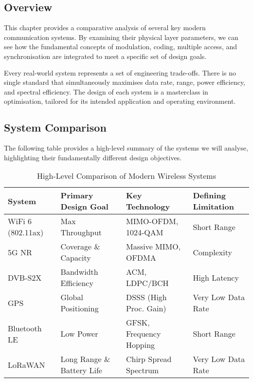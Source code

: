 \subsection{Overview}

This chapter provides a comparative analysis of several key modern communication systems. By examining their physical layer parameters, we can see how the fundamental concepts of modulation, coding, multiple access, and synchronisation are integrated to meet a specific set of design goals.

\begin{keyconcept}
    Every real-world system represents a set of engineering trade-offs. There is no single standard that simultaneously maximises data rate, range, power efficiency, and spectral efficiency. The design of each system is a masterclass in optimisation, tailored for its intended application and operating environment.
\end{keyconcept}


\subsection{System Comparison}

The following table provides a high-level summary of the systems we will analyse, highlighting their fundamentally different design objectives.

\begin{table}[H]
    \centering
    \caption{High-Level Comparison of Modern Wireless Systems}
    \label{tab:system-comparison}
    \begin{tabular}{@{}llll@{}}
        \toprule
        \tableheaderfont System & \tableheaderfont Primary Design Goal & \tableheaderfont Key Technology & \tableheaderfont Defining Limitation \\
        \midrule
        WiFi 6 (802.11ax) & Max Throughput & MIMO-OFDM, 1024-QAM & Short Range \\
        5G NR & Coverage \& Capacity & Massive MIMO, OFDMA & Complexity \\
        DVB-S2X & Bandwidth Efficiency & ACM, LDPC/BCH & High Latency \\
        GPS & Global Positioning & DSSS (High Proc. Gain) & Very Low Data Rate \\
        Bluetooth LE & Low Power & GFSK, Frequency Hopping & Short Range \\
        LoRaWAN & Long Range \& Battery Life & Chirp Spread Spectrum & Very Low Data Rate \\
        \bottomrule
    \end{tabular}
\end{table}


